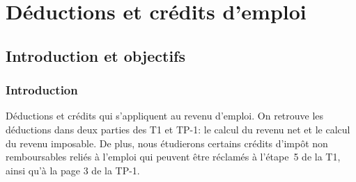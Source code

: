 \chapter{Déductions et crédits d'emploi}
\section{Introduction et objectifs}
\subsection{Introduction}
Déductions et crédits qui s'appliquent au revenu d'emploi. On retrouve les déductions dans deux parties des T1 et TP-1: le calcul du revenu net et le calcul du  revenu imposable. De plus, nous étudierons certains crédits d'impôt non remboursables reliés à l'emploi qui peuvent être réclamés à l'étape~5 de la T1, ainsi qu'à la page 3 de la TP-1.


